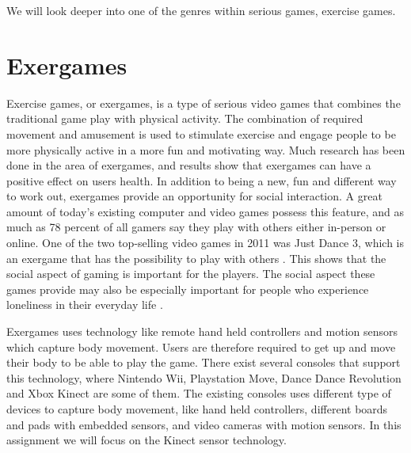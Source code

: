 We will look deeper into one of the genres within serious games, exercise games.  

\section{Exergames}
Exercise games, or exergames, is a type of serious video games that combines the traditional game play with physical activity. The combination of required movement and amusement is used to stimulate exercise and engage people to be more physically active in a more fun and motivating way. Much research has been done in the area of exergames, and results show that exergames can have a positive effect on users health. In addition to being a new, fun and different way to work out, exergames provide an opportunity for social interaction. A great amount of today’s existing computer and video games possess this feature, and as much as 78 percent of all gamers say they play with others either in-person or online. One of the two top-selling video games in 2011 was Just Dance 3, which is an exergame that has the possibility to play with others \cite{statistics2012}. This shows that the social aspect of gaming is important for the players. The social aspect these games provide may also be especially important for people who experience loneliness in their everyday life \cite{project}.

Exergames uses technology like remote hand held controllers and motion sensors which capture body movement. Users are therefore required to get up and move their body to be able to play the game. There exist several consoles that support this technology, where Nintendo Wii, Playstation Move, Dance Dance Revolution and Xbox Kinect are some of them. The existing consoles uses different type of devices to capture body movement, like hand held controllers, different boards and pads with embedded sensors, and video cameras with motion sensors. In this assignment we will focus on the Kinect sensor technology. 

